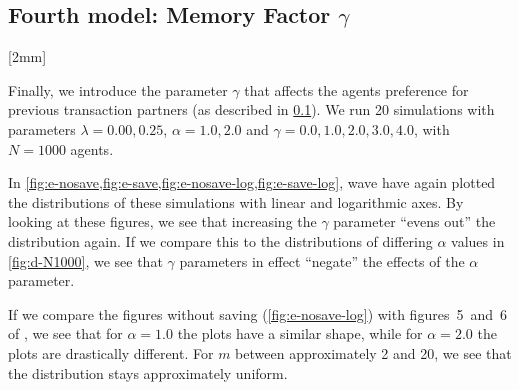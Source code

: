 \documentclass[12pt,a4paper]{article}
\newcommand\oppg[1]{\reversemarginnote{\textcolor{black!40}{#1)}}[2mm]}
\begin{document}
\clearpage
\subsection{Fourth model: Memory Factor $\gamma$} \label{sec:model4}
\oppg{e}

Finally, we introduce the parameter $\gamma$ that affects the agents preference for previous transaction partners (as described in \cref{sec:model4}). We run 20 simulations with parameters $\lambda = 0.00, 0.25$, $\alpha = 1.0, 2.0$ and $\gamma = 0.0, 1.0, 2.0, 3.0, 4.0$, with $N = 1000$ agents.

In \cref{fig:e-nosave,fig:e-save,fig:e-nosave-log,fig:e-save-log}, wave have again plotted the distributions of these simulations with linear and logarithmic axes.
By looking at these figures, we see that increasing the $\gamma$ parameter ``evens out'' the distribution again. If we compare this to the distributions of differing $\alpha$ values in \cref{fig:d-N1000}, we see that $\gamma$ parameters in effect ``negate'' the effects of the $\alpha$ parameter.

If we compare the figures without saving (\cref{fig:e-nosave-log}) with figures~5~and~6 of \textcite{goswami-sen}, we see that for $\alpha = 1.0$ the plots have a similar shape, while for $\alpha = 2.0$ the plots are drastically different.
For $m$ between approximately 2 and 20, we see that the distribution stays approximately uniform.
\end{document}
